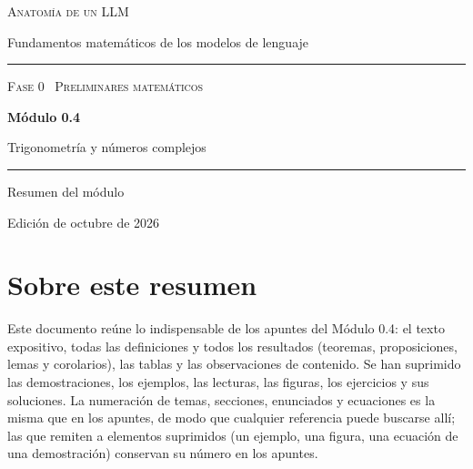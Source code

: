\documentclass[11pt,a4paper,twoside,openany]{book}
\begin{document}
\frontmatter
\begin{titlepage}
\centering
\vspace*{2.5cm}
{\large\scshape Anatomía de un LLM}\par
\vspace{0.4cm}
{\normalsize Fundamentos matemáticos de los modelos de lenguaje}\par
\vspace{2.2cm}
\rule{\textwidth}{0.8pt}\par\vspace{0.5cm}
{\small\scshape Fase 0 \textperiodcentered\ Preliminares matemáticos}\par\vspace{0.3cm}
{\Huge\bfseries Módulo 0.4\par}\vspace{0.3cm}
{\LARGE Trigonometría y números complejos\par}
\vspace{0.5cm}\rule{\textwidth}{0.4pt}\par
\vspace{1.6cm}
{\large Resumen del módulo}\par
\vfill
{\small Edición de octubre de 2026}\par
\end{titlepage}

\chapter*{Sobre este resumen}

Este documento reúne lo indispensable de los apuntes del Módulo 0.4: el texto expositivo, todas las definiciones y todos los resultados (teoremas, proposiciones, lemas y corolarios), las tablas y las observaciones de contenido. Se han suprimido las demostraciones, los ejemplos, las lecturas, las figuras, los ejercicios y sus soluciones. La numeración de temas, secciones, enunciados y ecuaciones es la misma que en los apuntes, de modo que cualquier referencia puede buscarse allí; las que remiten a elementos suprimidos (un ejemplo, una figura, una ecuación de una demostración) conservan su número en los apuntes.
\end{document}
